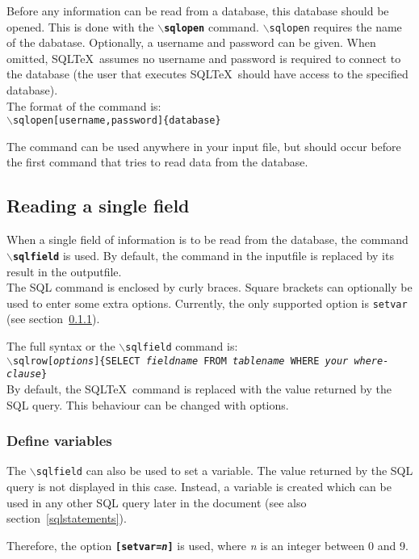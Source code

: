 \documentclass{article}
\newcommand{\bs}{\begin{math}\backslash\end{math}}
\begin{document}
Before any information can be read from a database, this database should be opened.
This is done with the \texttt{\textbf{\bs sqlopen}} command.
\texttt{\bs sqlopen} requires the name of the dabatase. Optionally, a username and password can be given. When
omitted, SQL\TeX\ assumes no username and password is required to connect to the database (the user that
executes SQL\TeX\ should have access to the specified database). \\
The format of the command is:\\
\texttt{\bs sqlopen[username,password]\{database\}}

The command can be used anywhere in your input file, but should occur before the first command that tries to
read data from the database.

\subsection{Reading a single field}\label{sqlfield}

When a single field of information is to be read from the database, the command \texttt{\textbf{\bs sqlfield}}
is used. By default, the command in the inputfile is replaced by its result in the outputfile.\\
The SQL command is enclosed by curly braces. Square brackets can optionally be used to enter some extra options.
Currently, the only supported option is \texttt{setvar} (see section~\ref{vars}).

The full syntax or the \texttt{\bs sqlfield} command is:\\
\texttt{\bs sqlrow[\textit{options}]\{SELECT \textit{fieldname} FROM \textit{tablename} WHERE \textit{your where-clause}\}} \\
By default, the SQL\TeX\ command is replaced with the value returned by the SQL query. This behaviour
can be changed with options.


\subsubsection{Define variables}\label{vars}

The \texttt{\bs sqlfield} can also be used to set a variable. The value returned by the SQL query is not
displayed in this case. Instead, a variable is created which can be used in any other SQL query later in
the document (see also section~\ref{sqlstatements}).

Therefore, the option \texttt{\textbf{[setvar=\textit{n}]}} is used, where \textit{n} is an integer between
0 and 9.
\end{document}
